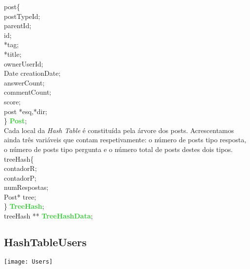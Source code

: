 \documentclass[10pt,a4paper]{article}
\begin{document}
 \noindent {\bf{\textcolor{Emerald}{typedef struct}}} post\{ \\
	\indent {\bf{\textcolor{Emerald}{int}}} postTypeId;\\ 
	\indent {\bf{\textcolor{Emerald}{long}}} parentId; \\
	\indent {\bf{\textcolor{Emerald}{long}}} id; \\
    \indent {\bf{\textcolor{Emerald}{char}}} *tag; \\
	\indent {\bf{\textcolor{Emerald}{char}}} *title; \\
	\indent {\bf{\textcolor{Emerald}{long}}} ownerUserId; \\ 
	\indent Date creationDate;\\
	\indent {\bf{\textcolor{Emerald}{int}}} answerCount; \\
	\indent {\bf{\textcolor{Emerald}{int}}} commentCount; \\
	\indent {\bf{\textcolor{Emerald}{int}}} score; \\
    \indent {\bf{\textcolor{Emerald}{struct}}} post *esq,*dir; \\
\} {\bf{\textcolor{LimeGreen}{Post}}};\\

Cada local da \textit{Hash Table} é constituída pela árvore dos posts. Acrescentamos ainda três variáveis que contam respetivamente: o número de posts tipo resposta, o número de posts tipo pergunta e o número total de posts destes dois tipos.\\

 \noindent {\bf{\textcolor{Emerald}{typedef struct}}} treeHash\{ \\
    \indent {\bf{\textcolor{Emerald}{long}}} contadorR; \\
    \indent {\bf{\textcolor{Emerald}{long}}} contadorP; \\
    \indent {\bf{\textcolor{Emerald}{int}}} numRespostas; \\
    \indent Post* tree; \\
\} {\bf{\textcolor{LimeGreen}{TreeHash}}};\\

 \noindent {\bf{\textcolor{Emerald}{typedef struct}}} treeHash ** {\bf{\textcolor{LimeGreen}{TreeHashData}}};

\subsection{HashTableUsers}

\begin{center}
\graphicspath{ {/home/jessica/Desktop/} }
\texttt{[image: Users]}\\
\end{center}
\end{document}
